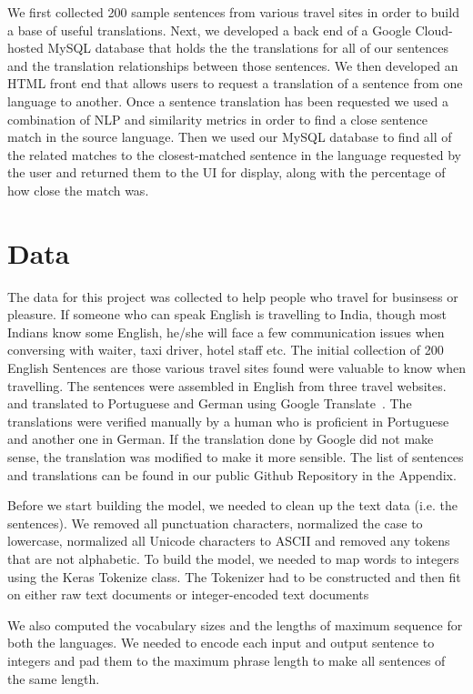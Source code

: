 \documentclass[runningheads]{llncs}
\begin{document}
	
	We first collected 200 sample sentences from various travel sites in order to build a base of useful translations. Next, we developed a back end of a Google Cloud-hosted MySQL database that holds the the translations for all of our sentences and the translation relationships between those sentences. We then developed an HTML front end that allows users to request a translation of a sentence from one language to another. Once a sentence translation has been requested we used a combination of NLP and similarity metrics in order to find a close sentence match in the source language. Then we used our MySQL database to find all of the related matches to the closest-matched sentence in the language requested by the user and returned them to the UI for display, along with the percentage of how close the match was. 

	\section{Data}
	The data for this project was collected to help people who travel for businsess or pleasure.  If someone who can speak English is travelling to India, though most Indians know some English, he/she will face a few communication issues when conversing with waiter, taxi driver, hotel staff etc. The initial collection of 200 English Sentences are those various travel sites found were valuable to know when travelling. The sentences were assembled in English from three travel websites.~\cite{ref_url11,ref_url12,ref_url13} and translated to Portuguese and German using Google Translate~\cite{ref_url14}. The translations were verified manually by a human who is proficient in Portuguese and another one in German. If the translation done by Google did not make sense, the translation was modified to make it more sensible. The list of sentences and translations can be found in our public Github Repository in the Appendix.
	
	Before we start building the model, we needed to clean up the text data (i.e. the sentences). We removed all punctuation characters, normalized the case to lowercase, normalized all Unicode characters to ASCII and removed any tokens that are not alphabetic. To build the model, we needed to map words to integers  using the Keras Tokenize class. The Tokenizer had to be constructed and then fit on either raw text documents or integer-encoded text documents
	
	We also computed the vocabulary sizes and the lengths of maximum sequence for both the languages. We needed to encode each input and output sentence to integers and pad them to the maximum phrase length to make all sentences of the same length. 
	
\end{document}
